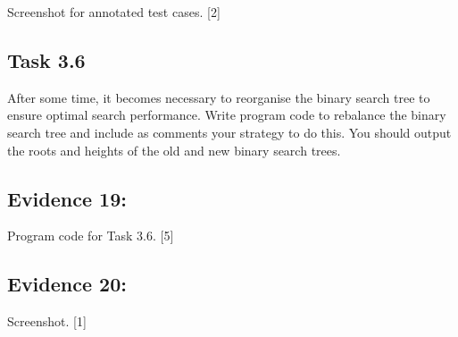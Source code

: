 Screenshot for annotated test cases. \hfill{}{[}2{]}

\subsection*{Task 3.6 }

After some time, it becomes necessary to reorganise the binary search
tree to ensure optimal search performance. Write program code to rebalance
the binary search tree and include as comments your strategy to do
this. You should output the roots and heights of the old and new binary
search trees.

\subsection*{Evidence 19:}

Program code for Task 3.6.\hfill{} {[}5{]}

\subsection*{Evidence 20:}

Screenshot.\hfill{} {[}1{]}